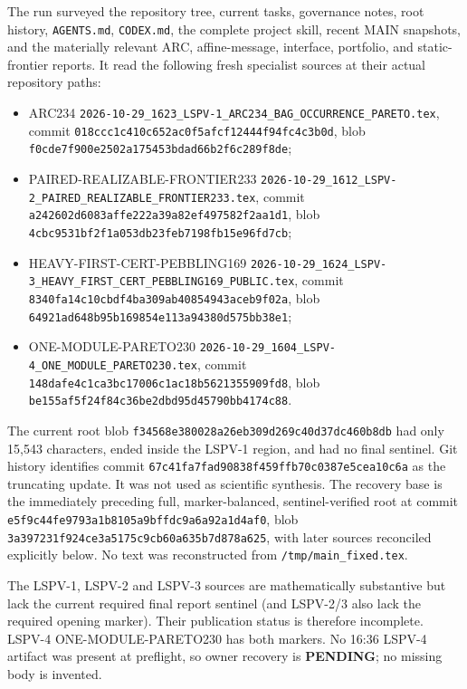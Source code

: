 \documentclass[11pt]{article}
\begin{document}
The run surveyed the repository tree, current tasks, governance notes, root history,
\texttt{AGENTS.md}, \texttt{CODEX.md}, the complete project skill, recent MAIN snapshots, and the
materially relevant ARC, affine-message, interface, portfolio, and static-frontier reports.  It read
the following fresh specialist sources at their actual repository paths:
\begin{itemize}
\item ARC234 \texttt{2026-10-29\_1623\_LSPV-1\_ARC234\_BAG\_OCCURRENCE\_PARETO.tex},
commit \texttt{018ccc1c410c652ac0f5afcf12444f94fc4c3b0d}, blob
\texttt{f0cde7f900e2502a175453bdad66b2f6c289f8de};
\item PAIRED-REALIZABLE-FRONTIER233
\texttt{2026-10-29\_1612\_LSPV-2\_PAIRED\_REALIZABLE\_FRONTIER233.tex},
commit \texttt{a242602d6083affe222a39a82ef497582f2aa1d1}, blob
\texttt{4cbc9531bf2f1a053db23feb7198fb15e96fd7cb};
\item HEAVY-FIRST-CERT-PEBBLING169
\texttt{2026-10-29\_1624\_LSPV-3\_HEAVY\_FIRST\_CERT\_PEBBLING169\_PUBLIC.tex},
commit \texttt{8340fa14c10cbdf4ba309ab40854943aceb9f02a}, blob
\texttt{64921ad648b95b169854e113a94380d575bb38e1};
\item ONE-MODULE-PARETO230
\texttt{2026-10-29\_1604\_LSPV-4\_ONE\_MODULE\_PARETO230.tex},
commit \texttt{148dafe4c1ca3bc17006c1ac18b5621355909fd8}, blob
\texttt{be155af5f24f84c36be2dbd95d45790bb4174c88}.
\end{itemize}

The current root blob \texttt{f34568e380028a26eb309d269c40d37dc460b8db} had only 15,543
characters, ended inside the LSPV-1 region, and had no final sentinel.  Git history identifies commit
\texttt{67c41fa7fad90838f459ffb70c0387e5cea10c6a} as the truncating update.  It was not used as
scientific synthesis.  The recovery base is the immediately preceding full, marker-balanced,
sentinel-verified root at commit \texttt{e5f9c44fe9793a1b8105a9bffdc9a6a92a1d4af0}, blob
\texttt{3a397231f924ce3a5175c9cb60a635b7d878a625}, with later sources reconciled explicitly below.
No text was reconstructed from \texttt{/tmp/main\_fixed.tex}.

The LSPV-1, LSPV-2 and LSPV-3 sources are mathematically substantive but lack the current required
final report sentinel (and LSPV-2/3 also lack the required opening marker).  Their publication status
is therefore incomplete.  LSPV-4 ONE-MODULE-PARETO230 has both markers.  No 16:36 LSPV-4 artifact
was present at preflight, so owner recovery is \textbf{PENDING}; no missing body is invented.
\end{document}
